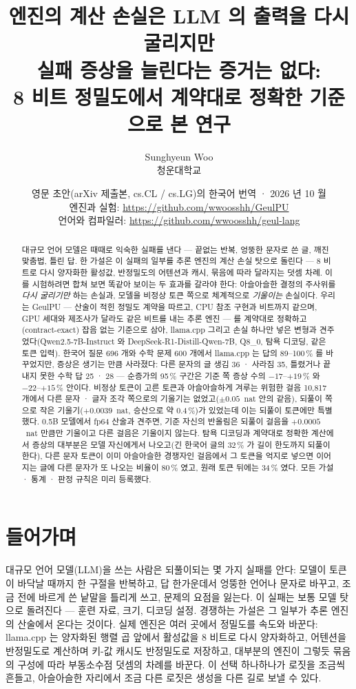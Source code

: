 \documentclass[11pt]{article}
\title{엔진의 계산 손실은 LLM 의 출력을 다시 굴리지만\\실패 증상을 늘린다는 증거는 없다:\\[2pt]
       {\large 8 비트 정밀도에서 계약대로 정확한 기준으로 본 연구}}
\author{Sunghyeun Woo\\[2pt]
        {\normalsize 청운대학교}}
\date{{\normalsize 영문 초안(arXiv 제출본, cs.CL / cs.LG)의 한국어 번역 · 2026 년 10 월}\\[6pt]
      {\small 엔진과 실험: \url{https://github.com/wwoosshh/GeulPU}\\
       언어와 컴파일러: \url{https://github.com/wwoosshh/geul-lang}}}
\begin{document}
\maketitle

\begin{abstract}
대규모 언어 모델은 때때로 익숙한 실패를 낸다 --- 끝없는 반복, 엉뚱한 문자로 쓴 글, 깨진 맞춤법, 틀린 답. 한 가설은 이 실패의
일부를 추론 엔진의 계산 손실 탓으로 돌린다 --- 8 비트로 다시 양자화한 활성값, 반정밀도의 어텐션과 캐시, 묶음에 따라 달라지는
덧셈 차례. 이를 시험하려면 합쳐 보면 똑같아 보이는 두 효과를 갈라야 한다: 아슬아슬한 결정의 주사위를 \emph{다시 굴리기만} 하는
손실과, 모델을 비정상 토큰 쪽으로 체계적으로 \emph{기울이는} 손실이다. 우리는 GeulPU --- 산술이 적힌 정밀도 계약을 따르고, CPU
참조 구현과 비트까지 같으며, GPU 세대와 제조사가 달라도 같은 비트를 내는 추론 엔진 --- 를 계약대로 정확하고(contract-exact)
잡음 없는 기준으로 삼아, llama.cpp 그리고 손실 하나만 넣은 변형과 견주었다(Qwen2.5-7B-Instruct 와 DeepSeek-R1-Distill-Qwen-7B,
Q8\_0, 탐욕 디코딩, 같은 토큰 입력). 한국어 질문 696 개와 수학 문제 600 개에서 llama.cpp 는 답의 89--100\,\% 를 바꾸었지만,
증상은 생기는 만큼 사라졌다: 다른 문자의 글 생김 36 · 사라짐 35, 틀렸거나 끝내지 못한 수학 답 25 · 28 --- 순증가의 95\,\%
구간은 기준 쪽 증상 수의 $-17$--$+19$\,\% 와 $-22$--$+15$\,\% 안이다. 비정상 토큰이 고른 토큰과 아슬아슬하게 겨루는 위험한 걸음
10,817 개에서 다른 문자 · 글자 조각 쪽으로의 기울기는 없었고($\pm0.05$~nat 안의 같음), 되풀이 쪽으로 작은 기울기($+0.0039$~nat,
승산으로 약 0.4\,\%)가 있었는데 이는 되풀이 토큰에만 특별했다. 0.5B 모델에서 fp64 산술과 견주면, 기준 자신의 반올림은 되풀이
걸음을 $+0.0005$~nat 만큼만 기울이고 다른 걸음은 기울이지 않는다. 탐욕 디코딩과 계약대로 정확한 계산에서 증상의 대부분은 모델
자신에게서 나오고(긴 한국어 글의 32\,\% 가 길이 한도까지 되풀이한다), 다른 문자 토큰이 이미 아슬아슬한 경쟁자인 걸음에서 그
토큰을 억지로 넣으면 이어지는 글에 다른 문자가 또 나오는 비율이 80\,\% 였고, 원래 토큰 뒤에는 34\,\% 였다. 모든 가설 · 통계 ·
판정 규칙은 미리 등록했다.
\end{abstract}

\section{들어가며}\label{sec:intro}

대규모 언어 모델(LLM)을 쓰는 사람은 되풀이되는 몇 가지 실패를 안다: 모델이 토큰이 바닥날 때까지 한 구절을 반복하고, 답
한가운데서 엉뚱한 언어나 문자로 바꾸고, 조금 전에 바르게 쓴 낱말을 틀리게 쓰고, 문제의 요점을 잃는다. 이 실패는 보통 모델
탓으로 돌려진다 --- 훈련 자료, 크기, 디코딩 설정. 경쟁하는 가설은 그 일부가 추론 엔진의 산술에서 온다는 것이다. 실제 엔진은
여러 곳에서 정밀도를 속도와 바꾼다: llama.cpp 는 양자화된 행렬 곱 앞에서 활성값을 8 비트로 다시 양자화하고, 어텐션을
반정밀도로 계산하며 키-값 캐시도 반정밀도로 저장하고, 대부분의 엔진이 그렇듯 묶음의 구성에 따라 부동소수점 덧셈의 차례를
바꾼다. 이 선택 하나하나가 로짓을 조금씩 흔들고, 아슬아슬한 자리에서 조금 다른 로짓은 생성을 다른 길로 보낼 수 있다.
\end{document}
